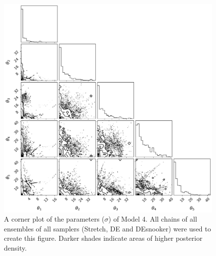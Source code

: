 \begin{figure}[ht]
\centering
\includegraphics[width=\textwidth]{Figures/appendix_figs/C1.4 corner plot Model 4.png}
\caption{A corner plot of the parameters ($\sigma$) of Model 4. All chains of all ensembles of all samplers (Stretch, DE and DEsnooker) were used to create this figure. Darker shades indicate areas of higher posterior density.}\label{fig_logbook_1.4_corner_model4}
\end{figure}

